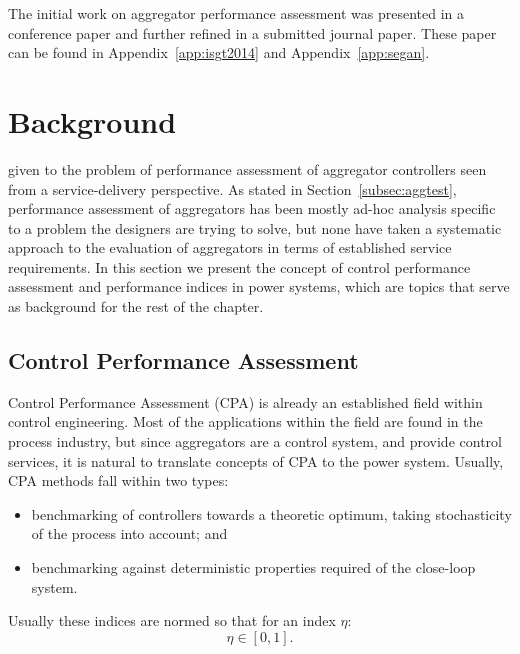 The initial work on aggregator performance assessment was presented in a conference paper and further refined in a submitted journal paper. These paper can be found in Appendix~\ref{app:isgt2014} and Appendix~\ref{app:segan}. 


\section{Background}
 given to the problem of performance assessment of aggregator controllers seen from a service-delivery perspective. As stated in Section~\ref{subsec:aggtest}, performance assessment of aggregators has been mostly ad-hoc analysis specific to a problem the designers are trying to solve, but none have taken a systematic approach to the evaluation of aggregators in terms of established service requirements. In this section we present the concept of control performance assessment and performance indices in power systems, which are topics that serve as background for the rest of the chapter.

\subsection{Control Performance Assessment}
Control Performance Assessment (CPA) is already an established field within control engineering. Most of the applications within the field are found in the process industry, but since aggregators are a control system, and provide control services, it is natural to translate concepts of CPA to the power system. Usually, CPA methods fall within two types:
\begin{itemize}
	\item benchmarking of controllers towards a theoretic optimum, taking stochasticity of the process into account; and
	\item benchmarking against deterministic properties required of the close-loop system.
\end{itemize}

Usually these indices are normed so that for an index $\eta$:
\begin{equation}
	\eta \in [0,1].
\end{equation}

